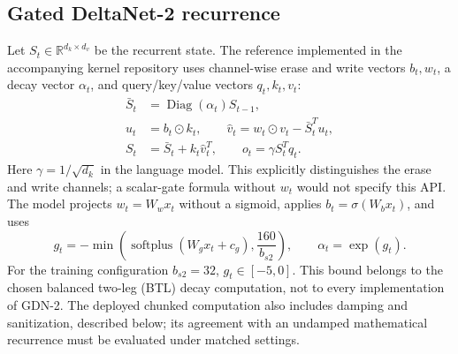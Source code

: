 \documentclass[10pt,a4paper]{article}
\begin{document}
\subsection{Gated DeltaNet-2 recurrence}
Let $S_t\in\mathbb{R}^{d_k\times d_v}$ be the recurrent state. The reference implemented
in the accompanying kernel repository uses channel-wise erase and write vectors
$b_t,w_t$, a decay vector $\alpha_t$, and query/key/value vectors $q_t,k_t,v_t$:
\begin{align}
 \bar S_t &= \operatorname{Diag}(\alpha_t)S_{t-1},\\
 u_t &= b_t\odot k_t,\qquad
 \widehat v_t=w_t\odot v_t-\bar S_t^T u_t,\\
 S_t &= \bar S_t+k_t\widehat v_t^T,\qquad
 o_t=\gamma S_t^Tq_t.\label{eq:recurrence}
\end{align}
Here $\gamma=1/\sqrt{d_k}$ in the language model. This explicitly distinguishes the
erase and write channels; a scalar-gate formula without $w_t$ would not specify this API.
The model projects $w_t=W_wx_t$ without a sigmoid, applies $b_t=\sigma(W_bx_t)$, and uses
\begin{equation}
 g_t=-\min\!\left(\operatorname{softplus}(W_gx_t+c_g),\frac{160}{b_{s2}}\right),
 \qquad \alpha_t=\exp(g_t).
\end{equation}
For the training configuration $b_{s2}=32$, $g_t\in[-5,0]$. This bound belongs to the
chosen balanced two-leg (BTL) decay computation, not to every implementation of GDN-2.
The deployed chunked computation also includes damping and sanitization, described below;
its agreement with an undamped mathematical recurrence must be evaluated under matched settings.
\end{document}
